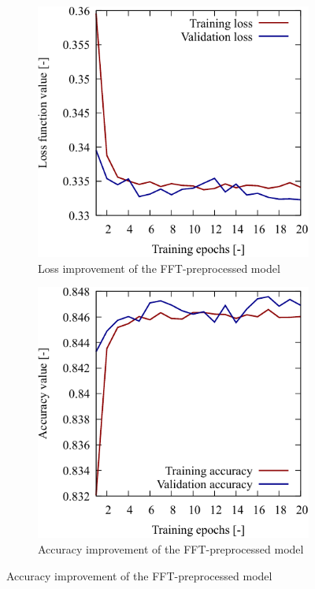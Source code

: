 \begin{figure}[H]
    \centering
    \begin{subfigure}[c]{0.45\linewidth}
        \includegraphics[width=\linewidth]{./Figure/4_Results/training/loss_fft.pdf}
        \caption{Loss improvement of the FFT-preprocessed model}
        \label{fig:stripePatternExpExample:a}
    \end{subfigure}
    \hfill
    \begin{subfigure}[c]{0.45\linewidth}
        \includegraphics[width=\linewidth]{./Figure/4_Results/training/acc_fft.pdf}
        \caption{Accuracy improvement of the FFT-preprocessed model}
        \label{fig:stripePatternExpExample:b}
    \end{subfigure}


\end{figure}
